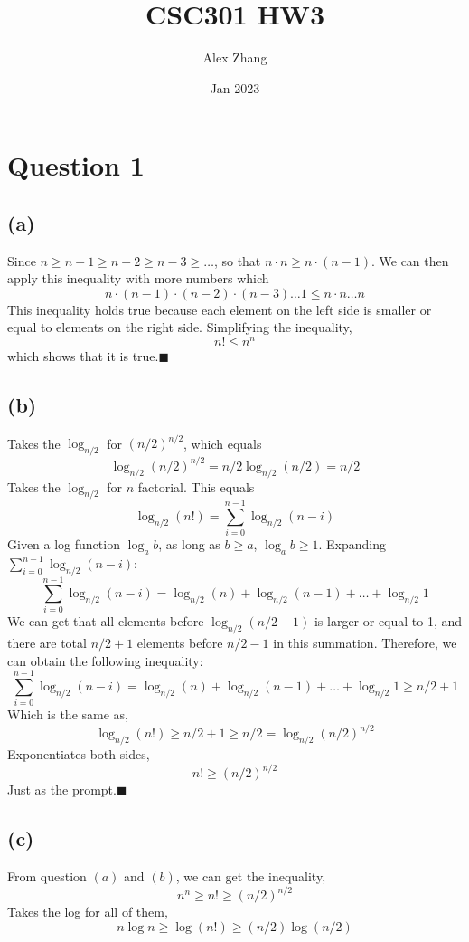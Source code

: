 \documentclass{article}
\title{CSC301 HW3}
\author{Alex Zhang}
\date{Jan 2023}
\begin{document}
\maketitle


\section*{Question 1}

    \subsection*{(a)}
    Since $n \geq n-1 \geq n-2 \geq n-3 \geq \dots $, so that $n \cdot n \geq n \cdot  (n-1)$. We can then apply this inequality
    with more numbers which  
    $$n \cdot (n-1) \cdot (n-2) \cdot (n-3) \dots  1 \leq n\cdot n \dots n$$
    This inequality holds true because each element on the left side is smaller or equal to elements on the right side.
    Simplifying the inequality,
    $$n! \leq n^n$$
    which shows that it is true.$\blacksquare$
    \subsection*{(b)}
    Takes the $\log_{n/2}$ for $(n/2)^{n/2}$, which equals 
    $$\log_{n/2}(n/2)^{n/2} = n/2\log_{n/2}(n/2) = n/2$$
    Takes the $\log_{n/2}$ for $n$ factorial. This equals
    $$\log_{n/2}(n!) = \sum_{i=0}^{n-1}\log_{n/2}(n-i)$$
    Given a log function $\log_ab$, as long as $b \geq a$, $\log_ab \geq 1$. Expanding $\sum_{i=0}^{n-1}\log_{n/2}(n-i)$:
    $$\sum_{i=0}^{n-1}\log_{n/2}(n-i) = \log_{n/2}(n) + \log_{n/2}(n-1) + \dots + \log_{n/2}1$$
    We can get that all elements before $\log_{n/2}(n/2-1)$ is larger or equal to 1, and there are total $n/2 + 1$
    elements before $n/2-1$ in this summation. Therefore, we can obtain
    the following inequality:
    $$\sum_{i=0}^{n-1}\log_{n/2}(n-i) = \log_{n/2}(n) + \log_{n/2}(n-1) + \dots + \log_{n/2}1 \geq n/2 + 1$$
    Which is the same as,
    $$\log_{n/2}(n!) \geq n/2 + 1 \geq n/2 = \log_{n/2}(n/2)^{n/2} $$
    Exponentiates both sides,
    $$n! \geq (n/2)^{n/2}$$
    Just as the prompt.$\blacksquare$


    \subsection*{(c)}
    From question $(a)$ and $(b)$, we can get the inequality,
    $$n^n \geq n! \geq (n/2)^{n/2}$$
    Takes the log for all of them,
    $$n\log n \geq \log(n!) \geq (n/2)\log(n/2) $$
\end{document}
